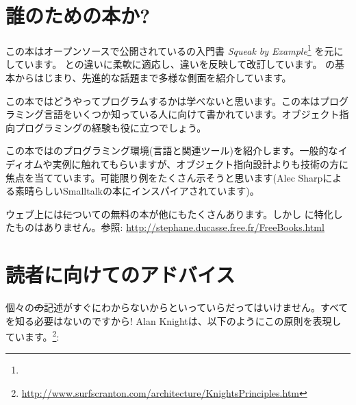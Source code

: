 \documentclass[a4paper,10pt,twoside]{book}
\begin{document}
\section*{誰のための本か?}

この本はオープンソースで公開されている\squeak の入門書 \emph{Squeak by Example}\footnote{\sbe} を元にしています。
\pharo と\squeak の違いに柔軟に適応し、違いを反映して改訂しています。
\pharo の基本からはじまり、先進的な話題まで多様な側面を紹介しています。

この本ではどうやってプログラムするかは学べないと思います。この本はプログラミング言語をいくつか知っている人に向けて書かれています。オブジェクト指向プログラミングの経験も役に立つでしょう。

この本では\pharo のプログラミング環境(言語と関連ツール)を紹介します。一般的なイディオムや実例に触れてもらいますが、オブジェクト指向設計よりも技術の方に焦点を当てています。可能限り例をたくさん示そうと思います(Alec Sharpによる素晴らしいSmalltalkの本\cite{Shar97a}にインスパイアされています)。

ウェブ上には\st についての無料の本が他にもたくさんあります。しかし \pharo に特化したものはありません。参照:
\url{http://stephane.ducasse.free.fr/FreeBooks.html}

\ifluluelse{}{\newpage} %
\section*{読者に向けてのアドバイス}


個々の\st の記述がすぐにわからないからといっていらだってはいけません。すべてを知る必要はないのですから!
Alan Knightは、以下のようにこの原則を表現しています。\footnote{\url{http://www.surfscranton.com/architecture/KnightsPrinciples.htm}}:

\end{document}
